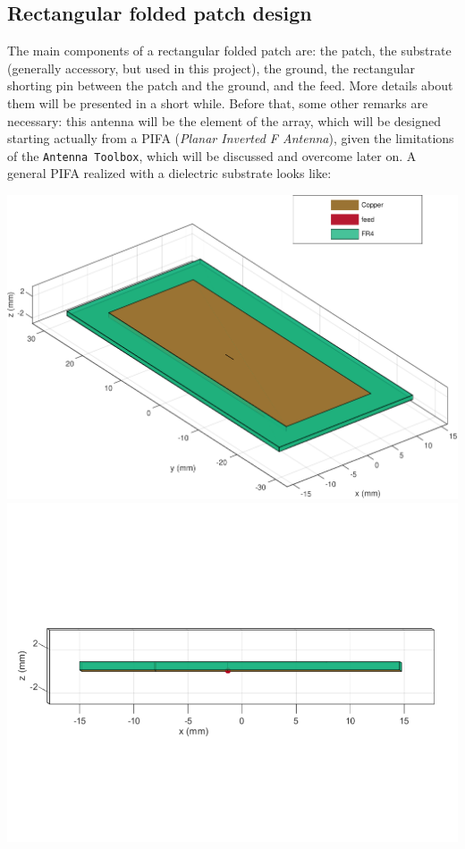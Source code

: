 \documentclass[12pt,a4paper]{article}
\begin{document}
{\subsection*{\selectfont\color{Turquoise}Rectangular folded patch design}
The main components of a rectangular folded patch are: the patch, the substrate (generally accessory, but used in this project), the ground, the rectangular shorting pin between the patch and the ground, and the feed. More details about them will be presented in a short while. Before that, some other remarks are necessary: this antenna will be the element of the array, which will be designed starting actually from a PIFA (\emph{Planar Inverted F Antenna}), given the limitations of the \texttt{\color{Mahogany}Antenna Toolbox}, which will be discussed and overcome later on. A general PIFA realized with a dielectric substrate looks like:
\begin{center}
\includegraphics[scale=0.35]{patch_structure.pdf}
\includegraphics[scale=0.35]{patch_structure_2.pdf}

\end{center}}
\end{document}
